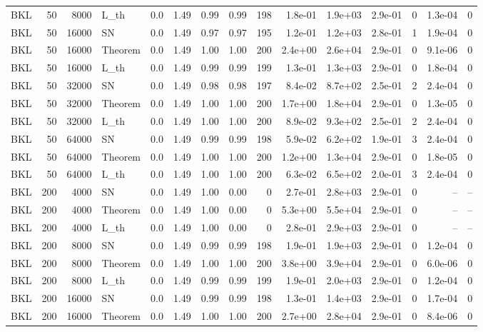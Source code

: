 \begin{tabular}{lrrlrrrrrrrrrrr}
BKL & 50 & 8000 & L\_th & 0.0 & 1.49 & 0.99 & 0.99 & 198 & 1.8e-01 & 1.9e+03 & 2.9e-01 & 0 & 1.3e-04 & 0 \\
BKL & 50 & 16000 & SN & 0.0 & 1.49 & 0.97 & 0.97 & 195 & 1.2e-01 & 1.2e+03 & 2.8e-01 & 1 & 1.9e-04 & 0 \\
BKL & 50 & 16000 & Theorem & 0.0 & 1.49 & 1.00 & 1.00 & 200 & 2.4e+00 & 2.6e+04 & 2.9e-01 & 0 & 9.1e-06 & 0 \\
BKL & 50 & 16000 & L\_th & 0.0 & 1.49 & 0.99 & 0.99 & 199 & 1.3e-01 & 1.3e+03 & 2.9e-01 & 0 & 1.8e-04 & 0 \\
BKL & 50 & 32000 & SN & 0.0 & 1.49 & 0.98 & 0.98 & 197 & 8.4e-02 & 8.7e+02 & 2.5e-01 & 2 & 2.4e-04 & 0 \\
BKL & 50 & 32000 & Theorem & 0.0 & 1.49 & 1.00 & 1.00 & 200 & 1.7e+00 & 1.8e+04 & 2.9e-01 & 0 & 1.3e-05 & 0 \\
BKL & 50 & 32000 & L\_th & 0.0 & 1.49 & 1.00 & 1.00 & 200 & 8.9e-02 & 9.3e+02 & 2.5e-01 & 2 & 2.4e-04 & 0 \\
BKL & 50 & 64000 & SN & 0.0 & 1.49 & 0.99 & 0.99 & 198 & 5.9e-02 & 6.2e+02 & 1.9e-01 & 3 & 2.4e-04 & 0 \\
BKL & 50 & 64000 & Theorem & 0.0 & 1.49 & 1.00 & 1.00 & 200 & 1.2e+00 & 1.3e+04 & 2.9e-01 & 0 & 1.8e-05 & 0 \\
BKL & 50 & 64000 & L\_th & 0.0 & 1.49 & 1.00 & 1.00 & 200 & 6.3e-02 & 6.5e+02 & 2.0e-01 & 3 & 2.4e-04 & 0 \\
BKL & 200 & 4000 & SN & 0.0 & 1.49 & 1.00 & 0.00 & 0 & 2.7e-01 & 2.8e+03 & 2.9e-01 & 0 & -- & -- \\
BKL & 200 & 4000 & Theorem & 0.0 & 1.49 & 1.00 & 0.00 & 0 & 5.3e+00 & 5.5e+04 & 2.9e-01 & 0 & -- & -- \\
BKL & 200 & 4000 & L\_th & 0.0 & 1.49 & 1.00 & 0.00 & 0 & 2.8e-01 & 2.9e+03 & 2.9e-01 & 0 & -- & -- \\
BKL & 200 & 8000 & SN & 0.0 & 1.49 & 0.99 & 0.99 & 198 & 1.9e-01 & 1.9e+03 & 2.9e-01 & 0 & 1.2e-04 & 0 \\
BKL & 200 & 8000 & Theorem & 0.0 & 1.49 & 1.00 & 1.00 & 200 & 3.8e+00 & 3.9e+04 & 2.9e-01 & 0 & 6.0e-06 & 0 \\
BKL & 200 & 8000 & L\_th & 0.0 & 1.49 & 0.99 & 0.99 & 199 & 1.9e-01 & 2.0e+03 & 2.9e-01 & 0 & 1.2e-04 & 0 \\
BKL & 200 & 16000 & SN & 0.0 & 1.49 & 0.99 & 0.99 & 198 & 1.3e-01 & 1.4e+03 & 2.9e-01 & 0 & 1.7e-04 & 0 \\
BKL & 200 & 16000 & Theorem & 0.0 & 1.49 & 1.00 & 1.00 & 200 & 2.7e+00 & 2.8e+04 & 2.9e-01 & 0 & 8.4e-06 & 0 \\

\end{tabular}
